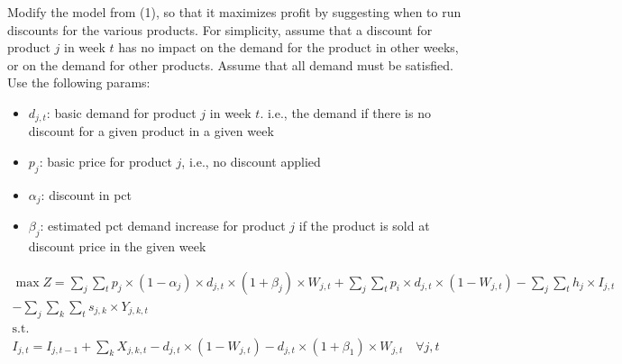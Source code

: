 \documentclass[10pt]{article}
\begin{document}
\begin{enumerate}
    Modify the model from (1), so that it maximizes profit by suggesting when to run discounts for the various products. For simplicity, assume that a discount for product $j $ in week $ t $ has no impact on the demand for the product in other weeks, or on the demand for other products. Assume that all demand must be satisfied. Use the following params: 
    \begin{itemize}
        \item $d_{j, t} $: basic demand for product $ j $ in week $t $. i.e., the demand if there is no discount for a given product in a given week 
        \item $p_j $: basic price for product $j $, i.e., no discount applied 
        \item $\alpha_j $: discount in pct 
        \item $\beta_j $: estimated pct demand increase for product $j $ if the product is sold at discount price in the given week 
    \end{itemize}
    \begin{gather*}
        \max Z = \sum_j\sum_t p_j\times(1 - \alpha_j)\times d_{j, t}\times (1 + \beta_j)\times W_{j, t} + \sum_j\sum_t p_i\times d_{j, t}\times (1 - W_{j, t}) - \sum_j\sum_t h_j\times I_{j, t} \\- \sum_j\sum_k\sum_t s_{j, k}\times Y_{j, k, t}\\
        \text{s.t.}\\
        I_{j, t} = I_{j, t - 1} + \sum_k X_{j, k, t} - d_{j, t}\times (1 - W_{j, t}) - d_{j, t}\times (1 + \beta_1)\times W_{j, t}\quad\forall j, t
    \end{gather*}
\end{enumerate}

\newpage 
\appendix
\end{document}
